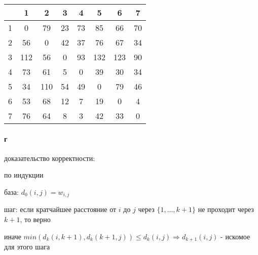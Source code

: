\documentclass[russian]{article}
\begin{document}
\begin{tabular}{|c|c|c|c|c|c|c|c|}\hline
& 1& 2& 3& 4& 5& 6& 7\\\hline
1&0&79&23&73&85&66&70\\\hline
2&56&0&42&37&76&67&34\\\hline
3&112&56&0&93&132&123&90\\\hline
4&73&61&5&0&39&30&34\\\hline
5&34&110&54&49&0&79&46\\\hline
6&53&68&12&7&19&0&4\\\hline
7&76&64&8&3&42&33&0\\\hline
\end{tabular}

\paragraph*{г} доказательство корректности:

по индукции

база: $d_0(i,j)=w_{i,j}$

шаг: если кратчайшее расстояние от $i$ до $j$ через $\{1, ..., k+1\}$ не проходит через $k+1$, то верно

иначе $min(d_k(i, k+1), d_k(k+1, j)) \le d_k(i, j) \Rightarrow d_{k+1}(i,j)$ - искомое для этого шага
\end{document}
